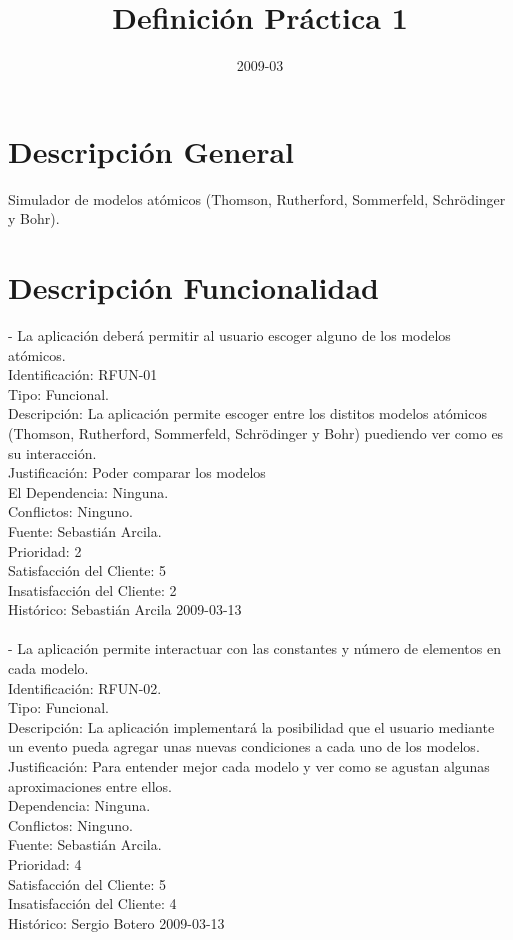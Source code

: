 \documentclass[]{article}
\title{Definici\'on Pr\'actica 1}
\author{  }
\date{2009-03}
\begin{document}
\ifpdf
{} 
\else
{}
\fi

\maketitle


\section{Descripci\'on General}
Simulador de modelos at\'omicos (Thomson, Rutherford, Sommerfeld, Schr\"odinger y Bohr).
\section{Descripci\'on Funcionalidad}
- La aplicaci\'on deber\'a permitir al usuario escoger alguno de los modelos at\'omicos.\\
Identificaci\'on: RFUN-01\\
Tipo: Funcional.\\
Descripci\'on: La aplicaci\'on permite escoger entre los distitos modelos at\'omicos (Thomson, Rutherford, Sommerfeld, Schr\"odinger y Bohr) puediendo ver como es su interacci\'on.\\
Justificaci\'on:  Poder comparar los modelos\\
El Dependencia:    Ninguna.\\
Conflictos: Ninguno.\\
Fuente: Sebasti\'an Arcila.\\
Prioridad: 2\\
Satisfacci\'on del Cliente: 5\\
Insatisfacci\'on del Cliente: 2\\
Hist\'orico: Sebasti\'an Arcila 2009-03-13\\\\
- La aplicaci\'on permite interactuar con las constantes y n\'umero de elementos en cada modelo.\\
Identificaci\'on: RFUN-02.\\
Tipo: Funcional.\\
Descripci\'on: La aplicaci\'on implementar\'a la posibilidad que el usuario mediante un evento pueda agregar unas nuevas condiciones a cada uno de los modelos.\\
Justificaci\'on:  Para entender mejor cada modelo y ver como se agustan algunas aproximaciones entre ellos.\\
Dependencia: Ninguna.\\
Conflictos: Ninguno.\\
Fuente: Sebasti\'an Arcila.\\
Prioridad: 4\\
Satisfacci\'on del Cliente: 5\\
Insatisfacci\'on del Cliente: 4\\
Hist\'orico: Sergio Botero 2009-03-13\\
\end{document}

